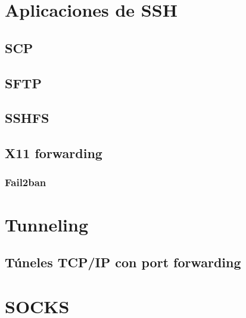 \documentclass[a4paper, 11pt, titlepage]{article}
\begin{document}
\section{Aplicaciones de SSH}
    \subsection{SCP}
    \subsection{SFTP}
    \subsection{SSHFS}
    \subsection{X11 forwarding}
    \subsubsection{Fail2ban}
\section{Tunneling}
    \subsection{Túneles TCP/IP con port forwarding}
\section{SOCKS}
\end{document}
